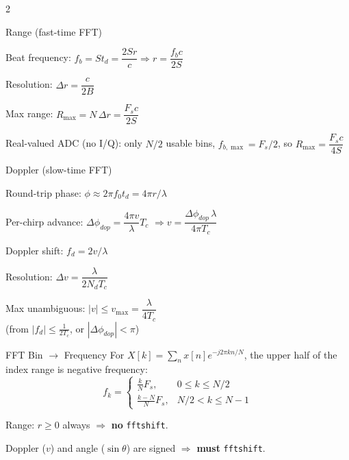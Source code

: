 \begin{multicols}{2}
\begin{sectionbox}{Range (fast-time FFT)}
\begin{cheatlist}
\item Beat frequency: $f_b = St_d = \dfrac{2Sr}{c} \Rightarrow r = \dfrac{f_bc}{2S}$
\item Resolution: $\Delta r = \dfrac{c}{2B}$
\item Max range: $R_{\max} = N\,\Delta r = \dfrac{F_sc}{2S}$
\item Real-valued ADC (no I/Q): only $N/2$ usable bins, $f_{b,\max} = F_s/2$, so $R_{\max} = \dfrac{F_sc}{4S}$
\end{cheatlist}
\end{sectionbox}

\begin{sectionbox}{Doppler (slow-time FFT)}
\begin{cheatlist}
\item Round-trip phase: $\phi \approx 2\pi f_0t_d = 4\pi r / \lambda$
\item Per-chirp advance: $\Delta\phi_{dop} = \dfrac{4\pi v}{\lambda}T_c$
  $\Rightarrow v = \dfrac{\Delta\phi_{dop}\,\lambda}{4\pi T_c}$
\item Doppler shift: $f_d = 2v/\lambda$
\item Resolution: $\Delta v = \dfrac{\lambda}{2N_dT_c}$
\item Max unambiguous: $|v| \le v_{\max} = \dfrac{\lambda}{4T_c}$ \\
  (from $|f_d| \le \tfrac{1}{2T_c}$, or $|\Delta\phi_{dop}| < \pi$)
\end{cheatlist}
\end{sectionbox}

\begin{sectionbox}{FFT Bin $\to$ Frequency}
For $X[k] = \sum_n x[n]e^{-j2\pi kn/N}$, the upper half of the index range is negative frequency:
\[ f_k = \begin{cases} \frac{k}{N}F_s, & 0 \le k \le N/2 \\[1pt] \frac{k-N}{N}F_s, & N/2 < k \le N-1 \end{cases} \]
\begin{cheatlist}
\item Range: $r \ge 0$ always $\Rightarrow$ \textbf{no} \lstinline{fftshift}.
\item Doppler ($v$) and angle ($\sin\theta$) are signed $\Rightarrow$ \textbf{must} \lstinline{fftshift}.
\end{cheatlist}
\end{sectionbox}


\end{multicols}
